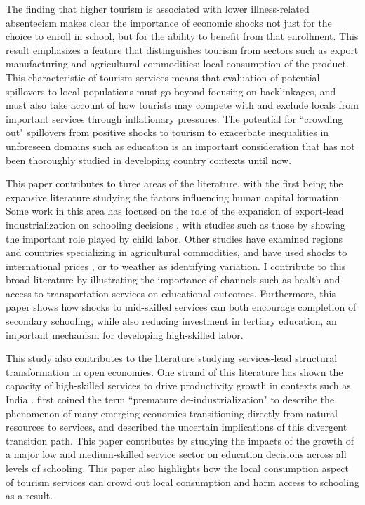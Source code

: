\documentclass[12pt]{article}
\begin{document}
	 The finding that higher tourism is associated with lower illness-related absenteeism makes clear the importance of economic shocks not just for the choice to enroll in school, but for the ability to benefit from that enrollment. This result emphasizes a feature that distinguishes tourism from sectors such as export manufacturing and agricultural commodities: local consumption of the product. This characteristic of tourism services means that evaluation of potential spillovers to local populations must go beyond focusing on backlinkages, and must also take account of how tourists may compete with and exclude locals from important services through inflationary pressures. The potential for ``crowding out" \parencite{ allen_urban_2021} spillovers from positive shocks to tourism to exacerbate inequalities in unforeseen domains such as education is an important consideration that has not been thoroughly studied in developing country contexts until now. 
	 
	 
	This paper contributes to three areas of the literature, with the first being the expansive literature studying the factors influencing human capital formation. Some work in this area has focused on the role of the expansion of export-lead industrialization on schooling decisions \parencite{nguyen_export_2025, cai_migration_2024, atkin_endogenous_2016, heath_manufacturing_2015}, with studies such as those by \textcite{bau_human_2020, edmonds_trade_2010, edmonds_child_2005} showing the important role played by child labor. Other studies have examined regions and countries specializing in agricultural commodities, and have used shocks to international prices \parencite{beshir_price_2024, carrillo_present_2020}, or to weather \parencite{ zimmermann_remember_2020,shah_drought_2017} as identifying variation. I contribute to this broad literature by illustrating the importance of channels such as health and access to transportation services on educational outcomes. Furthermore, this paper shows how shocks to mid-skilled services can both encourage completion of secondary schooling, while also reducing investment in tertiary education, an important mechanism for developing high-skilled labor. 
	
	This study also contributes to the literature studying services-lead structural transformation in open economies. One strand of this literature has shown the capacity of high-skilled services to drive productivity growth in contexts such as India \parencite{ peters_skipping_2026,fan_growing_2023}. \textcite{ rodrik_premature_2016} first coined the term ``premature de-industrialization" to describe the phenomenon of many emerging economies transitioning directly from natural resources to services, and described the uncertain implications of this divergent transition path. This paper contributes by studying the impacts of the growth of a major low and medium-skilled service sector on education decisions across all levels of schooling. This paper also highlights how the local consumption aspect of tourism services can crowd out local consumption and harm access to schooling as a result. 
	
\end{document}
